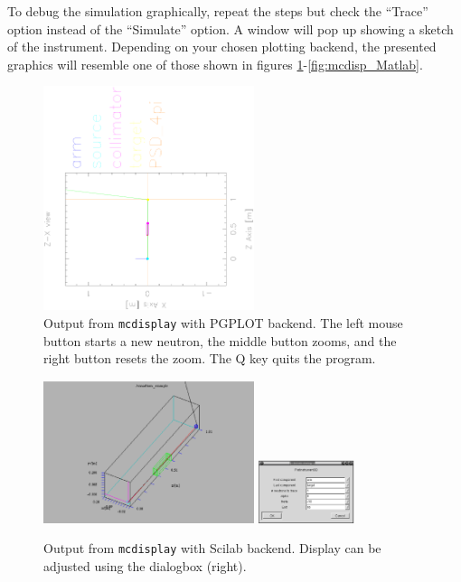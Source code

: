 To debug the simulation graphically, repeat the
steps but check the ``Trace'' option instead of the ``Simulate'' option.
A window will pop up showing a sketch of the instrument. 
Depending on your
chosen plotting backend, the presented graphics will resemble one of
those shown in figures \ref{fig:mcdisp_PGPLOT}-\ref{fig:mcdisp_Matlab}.
\begin{figure}[htb!]
  \begin{center}
    \includegraphics[width=0.55\textwidth]{figures/mcdisplay_PGPLOT.ps}
  \end{center}
\caption{Output from \texttt{mcdisplay} with PGPLOT backend. 
  The left mouse button starts a new neutron, the middle button zooms, and
  the right button resets the zoom. The Q key quits the program.}
\label{fig:mcdisp_PGPLOT}
\end{figure}
\begin{figure}[htb!]
  \begin{center}
    \includegraphics[width=0.55\textwidth]{figures/mcdisplay_Scilab.ps}
    \includegraphics[width=0.25\textwidth]{figures/mcdisplay_Scilab_dialog.ps}
  \end{center}
\caption{Output from \texttt{mcdisplay} with Scilab backend. Display
  can be adjusted using the dialogbox (right).}
\label{fig:mcdisp_Scilab}
\end{figure}
